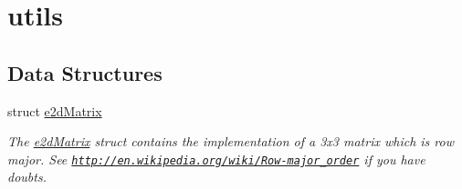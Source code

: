 \hypertarget{group__utils}{\section{utils}
\label{group__utils}
}
\subsection*{Data Structures}
\begin{DoxyCompactItemize}
\item 
struct \hyperlink{structe2dMatrix}{e2d\-Matrix}
\begin{DoxyCompactList}\small\item\em The \hyperlink{structe2dMatrix}{e2d\-Matrix} struct contains the implementation of a 3x3 matrix which is row major. See \href{http://en.wikipedia.org/wiki/Row-major_order}{\tt http\-://en.\-wikipedia.\-org/wiki/\-Row-\/major\-\_\-order} if you have doubts. \end{DoxyCompactList}\end{DoxyCompactItemize}
